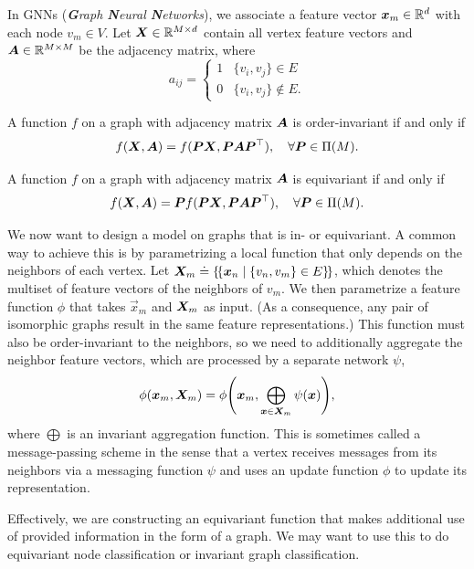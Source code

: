 In GNNs (\textit{\textbf{G}raph \textbf{N}eural \textbf{N}etworks}), we associate a feature vector
$\bm{x}_m \in \mathbb{R}^d$ with each node $v_m \in V$. Let $\bm{X} \in \mathbb{R}^{M \times d}$ contain all
vertex feature vectors and $\bm{A} \in \mathbb{R}^{M \times M}$ be the adjacency matrix, where \[
    a_{ij} = \begin{cases}
        1 & \{ v_i, v_j \} \in E      \\
        0 & \{ v_i, v_j \} \not\in E.
    \end{cases}
\]

\begin{definition}
    A function $f$ on a graph with adjacency matrix $\bm{A}$ is order-invariant if and only if \[
        f(\bm{X}, \bm{A}) = f(\bm{P}\bm{X}, \bm{P}\bm{A}\bm{P}^\top), \quad \forall \bm{P} \in \Pi(M).
    \]
\end{definition}

\begin{definition}
    A function $f$ on a graph with adjacency matrix $\bm{A}$ is equivariant if and only if \[
        f(\bm{X}, \bm{A}) = \bm{P} f(\bm{P}\bm{X}, \bm{P}\bm{A}\bm{P}^\top), \quad \forall \bm{P} \in \Pi(M).
    \]
\end{definition}

We now want to design a model on graphs that is in- or equivariant. A common way to achieve this is
by parametrizing a local function that only depends on the neighbors of each vertex. Let $\bm{X}_m
    \doteq \{\!\{ \bm{x}_n \mid \{ v_n, v_m \} \in E \}\!\}$, which denotes the multiset of feature
vectors of the neighbors of $v_m$. We then parametrize a feature function $\phi$ that takes
$\vec{x}_m$ and $\bm{X}_m$ as input. (As a consequence, any pair of isomorphic graphs result in
the same feature representations.) This function must also be order-invariant to the neighbors, so
we need to additionally aggregate the neighbor feature vectors, which are processed by a separate
network $\psi$, \[
    \phi(\vec{x}_m, \mat{X}_m) = \phi \lft( \vec{x}_m, \bigoplus_{\vec{x}\in \mat{X}_m} \psi(\vec{x}) \rgt),
\]
where $\bigoplus$ is an invariant aggregation function. This is sometimes called a message-passing
scheme in the sense that a vertex receives messages from its neighbors via a messaging function
$\psi$ and uses an update function $\phi$ to update its representation.

Effectively, we are constructing an equivariant function that makes additional use of provided
information in the form of a graph. We may want to use this to do equivariant node classification
or invariant graph classification.

